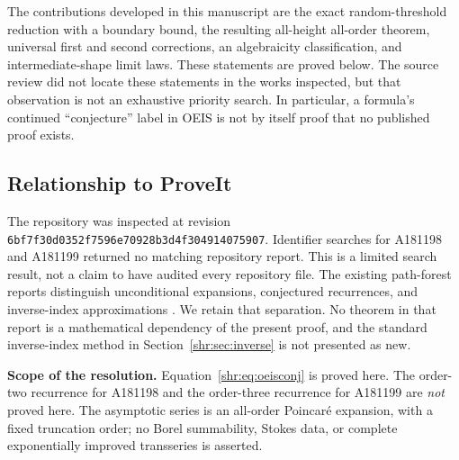 \documentclass[11pt,letterpaper]{article}
\numberwithin{equation}{section}
\theoremstyle{definition}
\newcommand{\1}{\mathbf 1}
\begin{document}
The contributions developed in this manuscript are the exact
random-threshold reduction with a boundary bound, the resulting all-height
all-order theorem, universal first and second corrections, an algebraicity
classification, and intermediate-shape limit laws. These statements are
proved below. The source review did not locate these statements in the
works inspected, but that observation is not an exhaustive priority search.
In particular, a formula's continued ``conjecture'' label in OEIS is not by
itself proof that no published proof exists.

\subsection{Relationship to ProveIt}
The repository was inspected at revision
\texttt{6bf7f30d0352f7596e70928b3d4f304914075907}. Identifier searches for
A181198 and A181199 returned no matching repository report. This is a
limited search result, not a claim to have audited every repository file.
The existing path-forest reports distinguish unconditional expansions,
conjectured recurrences, and inverse-index approximations
\cite{ProveIt}. We retain that separation. No theorem in that report is a
mathematical dependency of the present proof, and the standard inverse-index
method in Section~\ref{shr:sec:inverse} is not presented as new.

\begin{resultbox}
\textbf{Scope of the resolution.} Equation~\eqref{shr:eq:oeisconj} is proved
here. The order-two recurrence for A181198 and the order-three recurrence
for A181199 are \emph{not} proved here. The asymptotic series is an all-order
Poincar\'e expansion, with a fixed truncation order; no Borel summability,
Stokes data, or complete exponentially improved transseries is asserted.
\end{resultbox}
\end{document}
